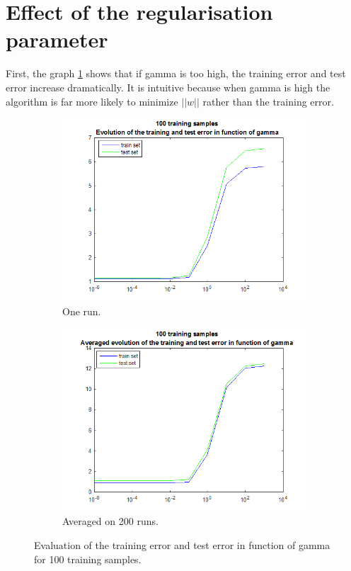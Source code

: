\documentclass{article} %
\begin{document}
\section{Effect of the regularisation parameter}

First, the graph \ref{fig:ex4_100} shows that if gamma is too high, the training error and test error increase dramatically. It is intuitive because when gamma is high the algorithm is far more likely to minimize $||w||$  rather than the training error.

 \begin{figure}[h]
\center
 \begin{subfigure}[b]{0.45\textwidth}
        \includegraphics[width=\textwidth]{4_100}
        \caption{One run.}
    \end{subfigure}
    \begin{subfigure}[b]{0.45\textwidth}
        \includegraphics[width=\textwidth]{4_100_avg}
        \caption{Averaged on 200 runs.}
    \end{subfigure}
    \caption{Evaluation of the training error and test error in function of gamma for 100 training samples.}
    \label{fig:ex4_100}
\end{figure}
\end{document}
